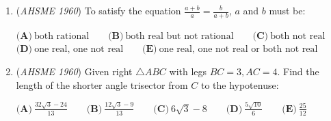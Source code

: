 \begin{enumerate}
$\textbf{(A)}\ b=\frac{a+c}{2}\qquad \textbf{(B)}\ b=\frac{a-c}{2}\qquad \textbf{(C)}\ a=\frac{b-c}{2} \qquad \textbf{(D)}\ a=\frac{b+c}{2}\qquad \textbf{(E)}\ \text{none of these}$


	\item (\textit{AHSME 1960}) To satisfy the equation $\frac{a+b}{a}=\frac{b}{a+b}$, $a$ and $b$ must be:


 $\textbf{(A)}\ \text{both rational}\qquad\textbf{(B)}\ \text{both real but not rational}\qquad\textbf{(C)}\ \text{both not real}\qquad$
$\textbf{(D)}\ \text{one real, one not real}\qquad\textbf{(E)}\ \text{one real, one not real or both not real}$


	\item (\textit{AHSME 1960}) Given right $\triangle ABC$ with legs $BC=3, AC=4$. Find the length of the shorter angle trisector from $C$ to the hypotenuse:


 $\textbf{(A)}\ \frac{32\sqrt{3}-24}{13}\qquad\textbf{(B)}\ \frac{12\sqrt{3}-9}{13}\qquad\textbf{(C)}\ 6\sqrt{3}-8\qquad\textbf{(D)}\ \frac{5\sqrt{10}}{6}\qquad\textbf{(E)}\ \frac{25}{12}\qquad$


\end{enumerate}